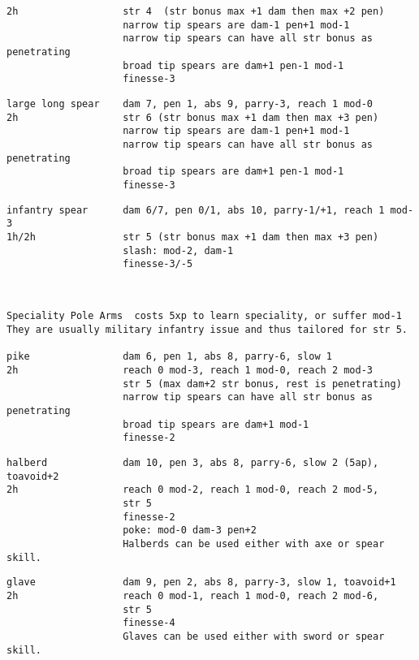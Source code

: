 \begin{samepage}
\begin{verbatim}
2h                  str 4  (str bonus max +1 dam then max +2 pen)
                    narrow tip spears are dam-1 pen+1 mod-1
                    narrow tip spears can have all str bonus as penetrating
                    broad tip spears are dam+1 pen-1 mod-1
                    finesse-3
\end{verbatim} \blocklistgap \begin{verbatim}
large long spear    dam 7, pen 1, abs 9, parry-3, reach 1 mod-0
2h                  str 6 (str bonus max +1 dam then max +3 pen)
                    narrow tip spears are dam-1 pen+1 mod-1
                    narrow tip spears can have all str bonus as penetrating
                    broad tip spears are dam+1 pen-1 mod-1
                    finesse-3
\end{verbatim} \blocklistgap \begin{verbatim}
infantry spear      dam 6/7, pen 0/1, abs 10, parry-1/+1, reach 1 mod-3
1h/2h               str 5 (str bonus max +1 dam then max +3 pen)
                    slash: mod-2, dam-1
                    finesse-3/-5
\end{verbatim} \end{samepage} \normalsize \goodbreak

\

\goodbreak \small \begin{samepage} \begin{verbatim}
Speciality Pole Arms  costs 5xp to learn speciality, or suffer mod-1
They are usually military infantry issue and thus tailored for str 5.

pike                dam 6, pen 1, abs 8, parry-6, slow 1
2h                  reach 0 mod-3, reach 1 mod-0, reach 2 mod-3
                    str 5 (max dam+2 str bonus, rest is penetrating)
                    narrow tip spears can have all str bonus as penetrating
                    broad tip spears are dam+1 mod-1
                    finesse-2
\end{verbatim} \blocklistgap \begin{verbatim}
halberd             dam 10, pen 3, abs 8, parry-6, slow 2 (5ap), toavoid+2
2h                  reach 0 mod-2, reach 1 mod-0, reach 2 mod-5,
                    str 5
                    finesse-2
                    poke: mod-0 dam-3 pen+2
                    Halberds can be used either with axe or spear skill.
\end{verbatim} \blocklistgap \begin{verbatim}
glave               dam 9, pen 2, abs 8, parry-3, slow 1, toavoid+1
2h                  reach 0 mod-1, reach 1 mod-0, reach 2 mod-6,
                    str 5
                    finesse-4
                    Glaves can be used either with sword or spear skill.
\end{verbatim} \end{samepage} \normalsize \goodbreak


